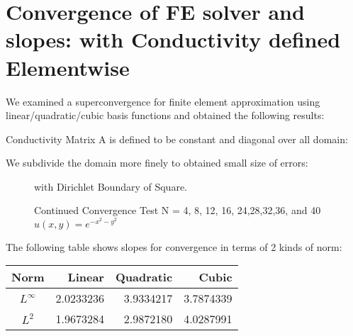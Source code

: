 \documentclass[11pt, notitlepage,  letterpaper]{article}
\begin{document}
%
\author{Seungkeol\ Choe \\ skchoe@cs.utah.edu}

\renewcommand{\today}{Apr 30th, 2004}





\section{Convergence of FE solver and slopes: with Conductivity defined Elementwise}

\medskip %
\renewcommand{\arraystretch}{1.5}

We examined a superconvergence for finite element approximation using linear/quadratic/cubic basis functions and obtained the following results:


Conductivity Matrix A is defined to be constant and diagonal over all domain:

We subdivide the domain more finely to obtained small size of errors:

\begin{figure}[h]
    \begin{center}
    \caption{\label{scrvsol2}Continued Convergence Test N = 4, 8, 12, 16, 24,28,32,36, and 40 $u(x,y) = e^{- x^2 - y^2}$} with Dirichlet Boundary of Square.
    \end{center}
\end{figure}

The following table shows slopes for convergence in terms of 2 kinds of norm:
\begin{center}
\begin{tabular}{|c||r|r|r|}  \hline
Norm  & Linear & Quadratic & Cubic\\ \hline \hline
$L^{\infty}$&2.0233236&3.9334217&3.7874339 \\\hline
$L^2$&1.9673284&2.9872180&4.0287991\\\hline
\end{tabular}
\end{center}
\end{document}
